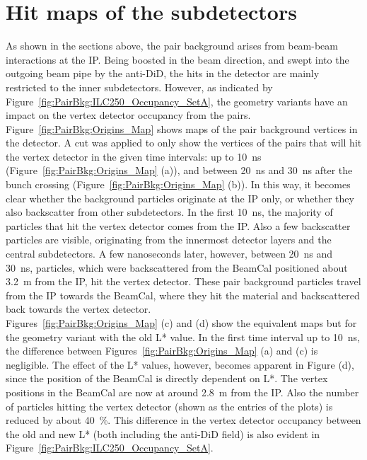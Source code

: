 \section{Hit maps of the \sid subdetectors}
\label{PairBkg:hitmaps}
As shown in the sections above, the \positron\electron pair background arises from beam-beam interactions at the IP.
Being boosted in the beam direction, and swept into the outgoing beam pipe by the anti-DiD, the hits in the \sid detector are mainly restricted to the inner subdetectors.
However, as indicated by Figure~\ref{fig:PairBkg:ILC250_Occupancy_SetA}, the \sid geometry variants have an impact on the vertex detector occupancy from the \positron\electron pairs.
\\Figure~\ref{fig:PairBkg:Origins_Map} shows maps of the pair background vertices in the \sid detector.
A cut was applied to only show the vertices of the pairs that will hit the vertex detector in the given time intervals: up to \SI{10}{\nano\second} (Figure~\ref{fig:PairBkg:Origins_Map} (a)), and between \SI{20}{\nano\second} and \SI{30}{\nano\second} after the bunch crossing (Figure~\ref{fig:PairBkg:Origins_Map} (b)).
In this way, it becomes clear whether the background particles originate at the IP only, or whether they also backscatter from other subdetectors.
In the first \SI{10}{\nano\second}, the majority of particles that hit the vertex detector comes from the IP.
Also a few backscatter particles are visible, originating from the innermost detector layers and the central subdetectors.
A few nanoseconds later, however, between \SI{20}{\nano\second} and \SI{30}{\nano\second}, particles, which were backscattered from the BeamCal positioned about \SI{3.2}{\meter} from the IP, hit the vertex detector.
These pair background particles travel from the IP towards the BeamCal, where they hit the material and backscattered back towards the vertex detector.
\\Figures~\ref{fig:PairBkg:Origins_Map} (c) and (d) show the equivalent maps but for the \sid geometry variant with the old L* value.
In the first time interval up to \SI{10}{\nano\second}, the difference between Figures~\ref{fig:PairBkg:Origins_Map} (a) and (c) is negligible.
The effect of the L* values, however, becomes apparent in Figure (d), since the position of the BeamCal is directly dependent on L*.
The vertex positions in the BeamCal are now at around \SI{2.8}{\meter} from the IP.
Also the number of particles hitting the vertex detector (shown as the entries of the plots) is reduced by about \SI{40}{\percent}.
This difference in the vertex detector occupancy between the old and new L* (both including the anti-DiD field) is also evident in Figure~\ref{fig:PairBkg:ILC250_Occupancy_SetA}.

